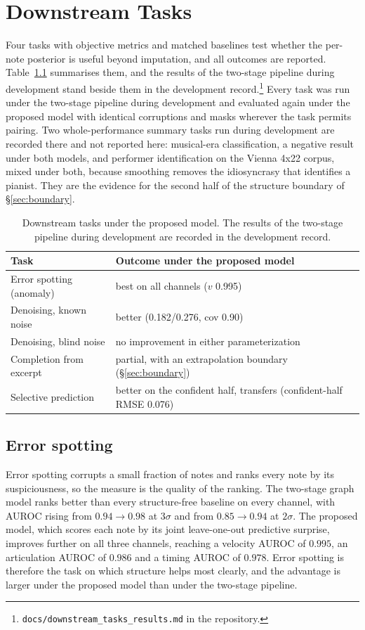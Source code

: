 \chapter{Downstream Tasks}\label{ch:downstream}
Four tasks with objective metrics and matched baselines test whether the
per-note posterior is useful beyond imputation, and all outcomes are
reported. Table~\ref{tab:downstream} summarises them, and the results of the
two-stage pipeline during development stand beside them in the development
record.\footnote{\texttt{docs/downstream\_tasks\_results.md} in the
repository.} Every task was run under the two-stage pipeline during
development and evaluated again under the proposed model with identical
corruptions and masks wherever the task permits pairing. Two
whole-performance summary tasks run during development are recorded there
and not reported here: musical-era classification, a negative result under
both models, and performer identification on the Vienna 4x22 corpus, mixed
under both, because smoothing removes the idiosyncrasy that identifies a
pianist. They are the evidence for the second half of the structure boundary
of \S\ref{sec:boundary}.

\begin{table}[h]\centering
\caption{Downstream tasks under the proposed model. The results of the
two-stage pipeline during development are recorded in the development
record.}
\label{tab:downstream}
\footnotesize
\begin{tabular}{@{}p{4.6cm}p{8.2cm}@{}}
\toprule
Task & Outcome under the proposed model \\
\midrule
Error spotting (anomaly) & best on all channels ($v$ 0.995) \\
Denoising, known noise & better (0.182/0.276, cov 0.90) \\
Denoising, blind noise & no improvement in either parameterization \\
Completion from excerpt & partial, with an extrapolation boundary (\S\ref{sec:boundary}) \\
Selective prediction & better on the confident half, transfers (confident-half RMSE 0.076) \\
\bottomrule
\end{tabular}
\end{table}

\section{Error spotting}
Error spotting corrupts a small fraction of notes and ranks every note by
its suspiciousness, so the measure is the quality of the ranking. The
two-stage graph model ranks better than every structure-free baseline on
every channel, with AUROC rising from $0.94 \to 0.98$ at $3\sigma$ and from
$0.85 \to 0.94$ at $2\sigma$. The proposed model, which scores each note by
its joint leave-one-out predictive surprise, improves further on all three
channels, reaching a velocity AUROC of $0.995$, an articulation AUROC of
$0.986$ and a timing AUROC of $0.978$. Error spotting is therefore the task
on which structure helps most clearly, and the advantage is larger under the
proposed model than under the two-stage pipeline.

